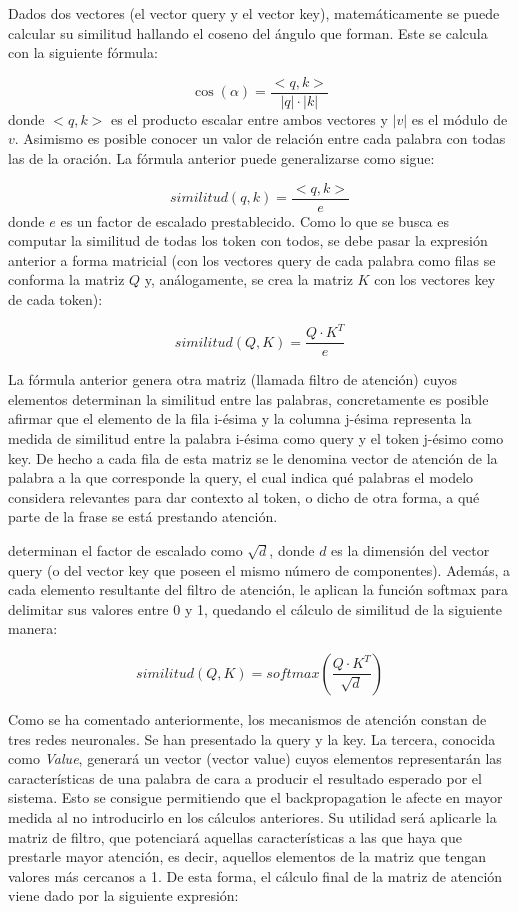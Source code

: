 Dados dos vectores (el vector query y el vector key), matemáticamente se puede calcular su similitud hallando el coseno del ángulo que forman. Este se calcula con la siguiente fórmula:

$$
\cos(\alpha) = \frac{<q, k>}{|q|\cdot|k|}
$$
donde $<q, k>$ es el producto escalar entre ambos vectores y $|v|$ es el módulo de $v$. Asimismo es posible conocer un valor de relación entre cada palabra con todas las de la oración. La fórmula anterior puede generalizarse como sigue:

$$
similitud(q,k)=\frac{<q, k>}{e}
$$
donde $e$ es un factor de escalado prestablecido. Como lo que se busca es computar la similitud de todas los token con todos, se debe pasar la expresión anterior a forma matricial (con los vectores query de cada palabra como filas se conforma la matriz $Q$ y, análogamente, se crea la matriz $K$ con los vectores key de cada token):

$$
similitud(Q, K)=\frac{Q\cdot K^T}{e}
$$

La fórmula anterior genera otra matriz (llamada filtro de atención) cuyos elementos determinan la similitud entre las palabras, concretamente es posible afirmar que el elemento de la fila i-ésima y la columna j-ésima representa la medida de similitud entre la palabra i-ésima como query y el token j-ésimo como key. De hecho a cada fila de esta matriz se le denomina vector de atención de la palabra a la que corresponde la query, el cual indica qué palabras el modelo considera relevantes para dar contexto al token, o dicho de otra forma, a qué parte de la frase se está prestando atención.

\cite{transformers} determinan el factor de escalado como $\sqrt{d}$, donde $d$ es la dimensión del vector query (o del vector key que poseen el mismo número de componentes). Además, a cada elemento resultante del filtro de atención, le aplican la función softmax para delimitar sus valores entre 0 y 1, quedando el cálculo de similitud de la siguiente manera:

$$
similitud(Q, K)=softmax\left(\frac{Q\cdot K^T}{\sqrt{d}}\right)
$$

Como se ha comentado anteriormente, los mecanismos de atención constan de tres redes neuronales. Se han presentado la query y la key. La tercera, conocida como \textit{Value}, generará un vector (vector value) cuyos elementos representarán las características de una palabra de cara a producir el resultado esperado por el sistema. Esto se consigue permitiendo que el backpropagation le afecte en mayor medida al no introducirlo en los cálculos anteriores. Su utilidad será aplicarle la matriz de filtro, que potenciará aquellas características a las que haya que prestarle mayor atención, es decir, aquellos elementos de la matriz que tengan valores más cercanos a 1. De esta forma, el cálculo final de la matriz de atención viene dado por la siguiente expresión:

